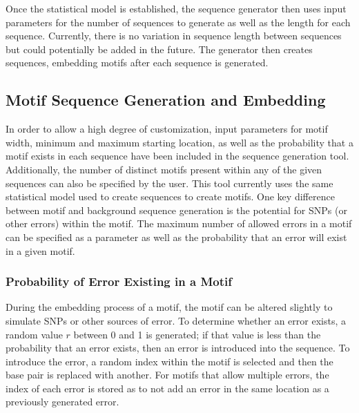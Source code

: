 \documentclass[12pt]{article}
\begin{document}
Once the statistical model is established, the sequence generator then uses input parameters for the number of sequences to generate as well as the length for each sequence. Currently, there is no variation in sequence length between sequences but could potentially be added in the future. The generator then creates sequences, embedding motifs after each sequence is generated.

\subsection{Motif Sequence Generation and Embedding}
In order to allow a high degree of customization, input parameters for motif width, minimum and maximum starting location, as well as the probability that a motif exists in each sequence have been included in the sequence generation tool. Additionally, the number of distinct motifs present within any of the given sequences can also be specified by the user. This tool currently uses the same statistical model used to create sequences to create motifs. One key difference between motif and background sequence generation is the potential for SNPs (or other errors) within the motif. The maximum number of allowed errors in a motif can be specified as a parameter as well as the probability that an error will exist in a given motif.

\subsubsection{Probability of Error Existing in a Motif}
During the embedding process of a motif, the motif can be altered slightly to simulate SNPs or other sources of error. To determine whether an error exists, a random value $r$ between 0 and 1 is generated; if that value is less than the probability that an error exists, then an error is introduced into the sequence. To introduce the error, a random index within the motif is selected and then the base pair is replaced with another. For motifs that allow multiple errors, the index of each error is stored as to not add an error in the same location as a previously generated error.
\end{document}
